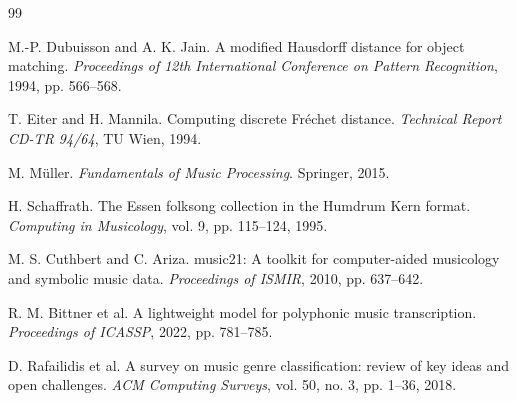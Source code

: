 \documentclass[withoutpreface]{cumcmthesis}
\begin{document}

\begin{thebibliography}{99}

    M.-P. Dubuisson and A. K. Jain.
    \newblock A modified Hausdorff distance for object matching.
    \newblock \textit{Proceedings of 12th International Conference on Pattern Recognition}, 1994, pp. 566--568.

    T. Eiter and H. Mannila.
    \newblock Computing discrete Fr\'{e}chet distance.
    \newblock \textit{Technical Report CD-TR 94/64}, TU Wien, 1994.

    M. M\"{u}ller.
    \newblock \textit{Fundamentals of Music Processing}.
    \newblock Springer, 2015.

    H. Schaffrath.
    \newblock The Essen folksong collection in the Humdrum Kern format.
    \newblock \textit{Computing in Musicology}, vol. 9, pp. 115--124, 1995.

    M. S. Cuthbert and C. Ariza.
    \newblock music21: A toolkit for computer-aided musicology and symbolic music data.
    \newblock \textit{Proceedings of ISMIR}, 2010, pp. 637--642.

    R. M. Bittner et al.
    \newblock A lightweight model for polyphonic music transcription.
    \newblock \textit{Proceedings of ICASSP}, 2022, pp. 781--785.

    D. Rafailidis et al.
    \newblock A survey on music genre classification: review of key ideas and open challenges.
    \newblock \textit{ACM Computing Surveys}, vol. 50, no. 3, pp. 1--36, 2018.

\end{thebibliography}

\end{document}
